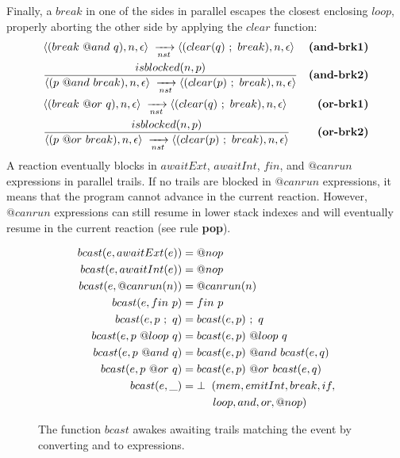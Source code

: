Finally, a $break$ in one of the sides in parallel escapes the closest 
enclosing $loop$, properly aborting the other side by applying the $clear$ 
function:
%
{ \setlength{\jot}{20pt}
\begin{eqnarray*}
& \LL (break~@and~q), n, \epsilon \RR \NST \LL (clear(q)~;~break),n,\epsilon \RR
    & \textbf{(and-brk1)}   \\
& \frac
    { \DS isblocked(n,p) }
    { \DS \LL (p~@and~break), n, \epsilon \RR \NST \LL (clear(p)~;~break),n,\epsilon \RR }
    & \textbf{(and-brk2)}   \\
& \LL (break~@or~q),n,\epsilon \RR \NST \LL (clear(q)~;~break),n,\epsilon \RR
    & \textbf{(or-brk1)}   \\
& \frac
    { \DS isblocked(n,p) }
    { \DS \LL (p~@or~break),n,\epsilon \RR \NST \LL (clear(p)~;~break),n,\epsilon \RR }
    & \textbf{(or-brk2)}   %
\end{eqnarray*}
}
%
A reaction eventually blocks in $awaitExt$, $awaitInt$, $fin$, and $@canrun$
expressions in parallel trails.
%
If no trails are blocked in $@canrun$ expressions, it means that the program 
cannot advance in the current reaction.
%
However, $@canrun$ expressions can still resume in lower stack indexes and will
eventually resume in the current reaction (see rule \textbf{pop}).

\begin{figure}
{\small
\begin{align*}
  bcast(e, awaitExt(e)) &= @nop                         \\
  bcast(e, awaitInt(e)) &= @nop                         \\
  bcast(e, @canrun(n))  &= @canrun(n)                   \\
  bcast(e, fin~p)       &= fin~p                        \\
  bcast(e, p~;~q)       &= bcast(e,p)~;~q               \\
  bcast(e, p~@loop~q)   &= bcast(e,p)~@loop~q           \\
  bcast(e, p~@and~q)    &= bcast(e,p)~@and~bcast(e,q)   \\
  bcast(e, p~@or~q)     &= bcast(e,p)~@or~bcast(e,q)    \\
  bcast(e, \_)          &= \bot \2 (mem,emitInt,break,if,  \\
                                 & \5\5 loop,and,or,@nop) %
\end{align*}
}
\caption{
The function $bcast$ awakes awaiting trails matching the event by converting
 and  to  expressions.
\label{fig.bcast}
}
\end{figure}

